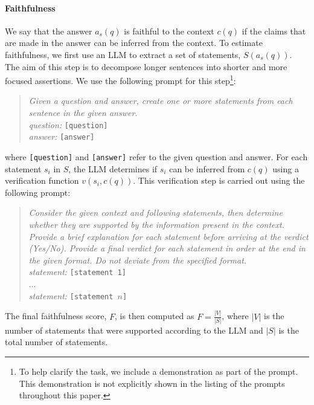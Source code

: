 \documentclass[11pt]{article}
\begin{document}


\paragraph{Faithfulness}
We say that the answer $a_s(q)$ is faithful to the context $c(q)$ if the claims that are made in the answer can be inferred from the context. To estimate faithfulness, we first use an LLM to extract a set of statements, \( S(a_s(q)) \). The aim of this step is to decompose longer sentences into shorter and more focused assertions. We use the following prompt for this step\footnote{To help clarify the task, we include a demonstration as part of the prompt. This demonstration is not explicitly shown in the listing of the prompts throughout this paper.}:
\begin{quote}
\textit{Given a question and answer, create one or more statements from each sentence in the given answer.\\
question:} \texttt{[question]}\\
\textit{answer:} \texttt{[answer]}
\end{quote}
where \texttt{[question]} and \texttt{[answer]} refer to the given question and answer.
For each statement \( s_i \) in \( S \), the LLM determines if \( s_i \) can be inferred from \( c(q) \) using a verification function \( v(s_i, c(q))\). This verification step is carried out using the following prompt:
\begin{quote}
\textit{Consider the given context and following statements, then determine whether they are supported by the information present in the context. Provide a brief explanation for each statement before arriving at the verdict (Yes/No). Provide a final verdict for each statement in order at the end in the given format. Do not deviate from the specified format.}\\
\textit{statement:} \texttt{[statement 1]}\\
...\\
\textit{statement:} \texttt{[statement $n$]}
\end{quote}
The final faithfulness score, \( F \), is then computed as \( F = \frac{|V|}{|S|} \), where \( |V| \) is the number of statements that were supported according to the LLM and \( |S| \) is the total number of statements.
\end{document}
